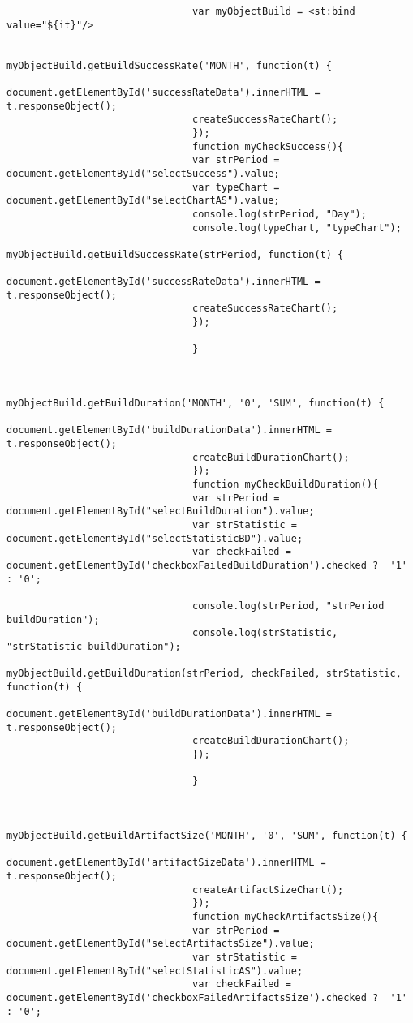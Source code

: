\begin{lstlisting}
                                var myObjectBuild = <st:bind value="${it}"/>

                                myObjectBuild.getBuildSuccessRate('MONTH', function(t) {
                                document.getElementById('successRateData').innerHTML = t.responseObject();
                                createSuccessRateChart();
                                });
                                function myCheckSuccess(){
                                var strPeriod = document.getElementById("selectSuccess").value;
                                var typeChart = document.getElementById("selectChartAS").value;
                                console.log(strPeriod, "Day");
                                console.log(typeChart, "typeChart");
                                myObjectBuild.getBuildSuccessRate(strPeriod, function(t) {
                                document.getElementById('successRateData').innerHTML = t.responseObject();
                                createSuccessRateChart();
                                });

                                }


                                myObjectBuild.getBuildDuration('MONTH', '0', 'SUM', function(t) {
                                document.getElementById('buildDurationData').innerHTML = t.responseObject();
                                createBuildDurationChart();
                                });
                                function myCheckBuildDuration(){
                                var strPeriod = document.getElementById("selectBuildDuration").value;
                                var strStatistic = document.getElementById("selectStatisticBD").value;
                                var checkFailed = document.getElementById('checkboxFailedBuildDuration').checked ?  '1' : '0';

                                console.log(strPeriod, "strPeriod buildDuration");
                                console.log(strStatistic, "strStatistic buildDuration");
                                myObjectBuild.getBuildDuration(strPeriod, checkFailed, strStatistic, function(t) {
                                document.getElementById('buildDurationData').innerHTML = t.responseObject();
                                createBuildDurationChart();
                                });

                                }


                                myObjectBuild.getBuildArtifactSize('MONTH', '0', 'SUM', function(t) {
                                document.getElementById('artifactSizeData').innerHTML = t.responseObject();
                                createArtifactSizeChart();
                                });
                                function myCheckArtifactsSize(){
                                var strPeriod = document.getElementById("selectArtifactsSize").value;
                                var strStatistic = document.getElementById("selectStatisticAS").value;
                                var checkFailed = document.getElementById('checkboxFailedArtifactsSize').checked ?  '1' : '0';


\end{lstlisting}
